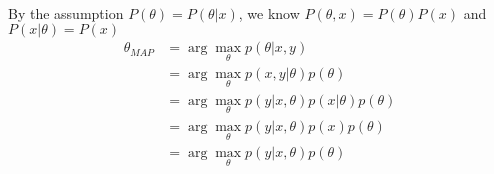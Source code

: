 \begin{answer}\\
By the assumption $P(\theta) = P(\theta|x)$, we know $P(\theta, x) = P(\theta)P(x)$ and $P(x|\theta) = P(x)$
\begin{align*}
    \theta_{MAP} &= \arg\max\limits_\theta p(\theta|x,y)\\
    &= \arg\max\limits_\theta p(x,y|\theta)p(\theta)\\
    &= \arg\max\limits_\theta p(y|x, \theta)p(x|\theta)p(\theta)\\
    &= \arg\max\limits_\theta p(y|x, \theta)p(x)p(\theta)\\
    &= \arg\max\limits_\theta p(y|x, \theta)p(\theta)
\end{align*}
\end{answer}
